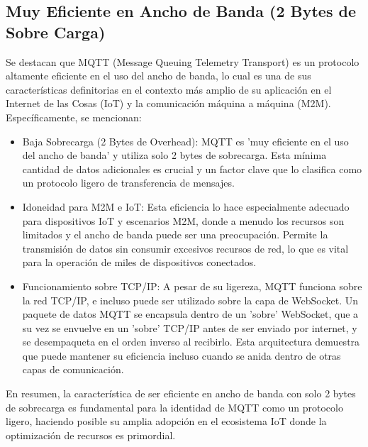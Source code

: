 \documentclass{report}
\begin{document}
\subsection{Muy Eficiente en Ancho de Banda (2 Bytes de Sobre Carga)}
Se destacan que MQTT (Message Queuing Telemetry Transport) es un protocolo altamente eficiente en el uso del ancho de banda, 
lo cual es una de sus características definitorias en el contexto más amplio de su aplicación en el Internet de las Cosas (IoT) y 
la comunicación máquina a máquina (M2M).
Específicamente, se  mencionan:
\begin{itemize}
    \item Baja Sobrecarga (2 Bytes de Overhead): MQTT es 'muy eficiente en el uso del ancho de banda' y utiliza solo 2 bytes de sobrecarga. 
    Esta mínima cantidad de datos adicionales es crucial y un factor clave que lo clasifica como un protocolo ligero de transferencia de mensajes.
    \item Idoneidad para M2M e IoT: Esta eficiencia lo hace especialmente adecuado para dispositivos IoT y escenarios M2M, donde a menudo los 
    recursos son limitados y el ancho de banda puede ser una preocupación. Permite la transmisión de datos sin consumir excesivos recursos de red, 
    lo que es vital para la operación de miles de dispositivos conectados.
    \item Funcionamiento sobre TCP/IP: A pesar de su ligereza, MQTT funciona sobre la red TCP/IP, e incluso puede ser utilizado sobre la 
    capa de WebSocket. Un paquete de datos MQTT se encapsula dentro de un 'sobre' WebSocket, que a su vez se envuelve en un 'sobre' TCP/IP 
    antes de ser enviado por internet, y se desempaqueta en el orden inverso al recibirlo. Esta arquitectura demuestra que puede mantener 
    su eficiencia incluso cuando se anida dentro de otras capas de comunicación.
\end{itemize}
En resumen, la característica de ser eficiente en ancho de banda con solo 2 bytes de sobrecarga es fundamental para la identidad de MQTT 
como un protocolo ligero, haciendo posible su amplia adopción en el ecosistema IoT donde la optimización de recursos es primordial.
\end{document}
